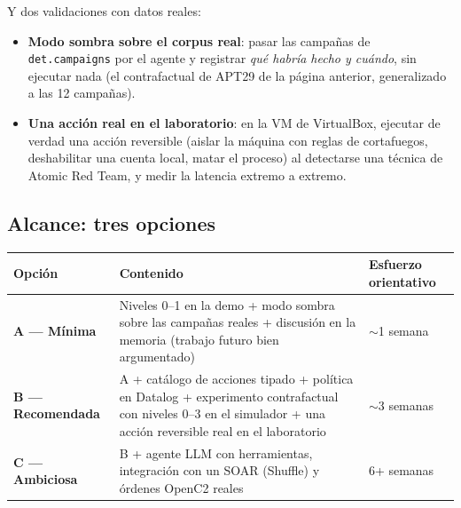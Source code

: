 \documentclass[11pt,a4paper]{article}
\newcommand{\cod}[1]{\texttt{#1}}
\begin{document}
Y dos validaciones con datos reales:
\begin{itemize}
  \item \textbf{Modo sombra sobre el corpus real}: pasar las campañas de \cod{det.campaigns} por el agente y registrar
        \textit{qué habría hecho y cuándo}, sin ejecutar nada (el contrafactual de APT29 de la página anterior,
        generalizado a las 12 campañas).
  \item \textbf{Una acción real en el laboratorio}: en la VM de VirtualBox, ejecutar de verdad una acción reversible
        (aislar la máquina con reglas de cortafuegos, deshabilitar una cuenta local, matar el proceso) al detectarse
        una técnica de Atomic Red Team, y medir la latencia extremo a extremo.
\end{itemize}

\subsection{Alcance: tres opciones}

\begin{center}
\small
\renewcommand{\arraystretch}{1.25}
\begin{tabularx}{\linewidth}{>{\bfseries}l X l}
\toprule
Opción & Contenido & Esfuerzo orientativo \\
\midrule
A — Mínima & Niveles 0–1 en la demo + modo sombra sobre las campañas reales + discusión en la memoria (trabajo futuro bien argumentado) & $\sim$1 semana \\
B — Recomendada & A + catálogo de acciones tipado + política en Datalog + experimento contrafactual con niveles 0–3 en el simulador + una acción reversible real en el laboratorio & $\sim$3 semanas \\
C — Ambiciosa & B + agente LLM con herramientas, integración con un SOAR (Shuffle) y órdenes OpenC2 reales & 6+ semanas \\
\bottomrule
\end{tabularx}
\end{center}
\end{document}
